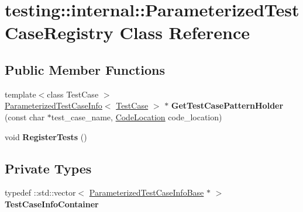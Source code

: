 \hypertarget{classtesting_1_1internal_1_1_parameterized_test_case_registry}{}\section{testing\+:\+:internal\+:\+:Parameterized\+Test\+Case\+Registry Class Reference}
\label{classtesting_1_1internal_1_1_parameterized_test_case_registry}
\subsection*{Public Member Functions}
\begin{DoxyCompactItemize}
\item 
\mbox{\label{classtesting_1_1internal_1_1_parameterized_test_case_registry_af525816aa348f9e33f5d900965991388}} 
{\footnotesize template$<$class Test\+Case $>$ }\\\mbox{\hyperlink{classtesting_1_1internal_1_1_parameterized_test_case_info}{Parameterized\+Test\+Case\+Info}}$<$ \mbox{\hyperlink{classtesting_1_1_test_case}{Test\+Case}} $>$ $\ast$ {\bfseries Get\+Test\+Case\+Pattern\+Holder} (const char $\ast$test\+\_\+case\+\_\+name, \mbox{\hyperlink{structtesting_1_1internal_1_1_code_location}{Code\+Location}} code\+\_\+location)
\item 
\mbox{\label{classtesting_1_1internal_1_1_parameterized_test_case_registry_ad5b63c8fe94f3d51d039a76c001c9223}} 
void {\bfseries Register\+Tests} ()
\end{DoxyCompactItemize}
\subsection*{Private Types}
\begin{DoxyCompactItemize}
\item 
\mbox{\label{classtesting_1_1internal_1_1_parameterized_test_case_registry_a4b2cde8f4f92749a8f685f33a9a3f7bf}} 
typedef \+::std\+::vector$<$ \mbox{\hyperlink{classtesting_1_1internal_1_1_parameterized_test_case_info_base}{Parameterized\+Test\+Case\+Info\+Base}} $\ast$ $>$ {\bfseries Test\+Case\+Info\+Container}
\end{DoxyCompactItemize}
